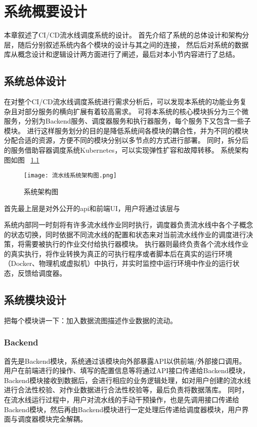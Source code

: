 
\chapter{系统概要设计}
本章叙述了CI/CD流水线调度系统的设计。
首先介绍了系统的总体设计和架构分层，随后分别叙述系统内各个模块的设计与其之间的连接，
然后后对系统的数据库从概念设计和逻辑设计两方面进行了阐述，最后对本小节内容进行了总结。

\section{系统总体设计}

在对整个CI/CD流水线调度系统进行需求分析后，可以发现本系统的功能业务复杂且对部分服务的横向扩展有着较高需求。
可将本系统的核心模块拆分为三个微服务，分别为Backend服务、调度器服务和执行器服务，每个服务下又包含一些子模块。
进行这样服务划分的目的是降低系统间各模块的耦合性，并为不同的模块分配合适的资源，方便不同的模块分别以多节点的方式进行部署。
同时，拆分后的服务借助容器调度系统Kubernetes，可以实现弹性扩容和故障转移。
系统架构图如图~ \ref{fig:系统架构图}

\begin{figure}[h]
  \centering
  \texttt{[image: 流水线系统架构图.png]}
  \caption{系统架构图}
  \label{fig:系统架构图}
\end{figure}

首先最上层是对外公开的api和前端UI，用户将通过该层与

系统内部同一时刻将有许多流水线作业同时执行，调度器负责流水线中各个子概念的状态切换，同时依据不同流水线的配置和状态来对当前流水线作业的调度进行决策，将需要被执行的作业交付给执行器模块。
执行器则最终负责各个流水线作业的真实执行，将作业转换为真正的可执行程序或者脚本后在真实的运行环境（Docker、物理机或虚拟机）中执行，并实时监控中运行环境中作业的运行状态，反馈给调度器。



\section{系统模块设计}
把每个模块讲一下：加入数据流图描述作业数据的流动。

\subsection{Backend}

首先是Backend模块，系统通过该模块向外部暴露API以供前端/外部接口调用。
用户在前端进行的操作、填写的配置信息等将通过API接口传递给Backend模块，Backend模块接收到数据后，会进行相应的业务逻辑处理，如对用户创建的流水线进行合法性校验、对作业数据进行合法性校验等，最后负责将数据落库。
同时，在流水线运行过程中，用户对流水线的手动干预操作，也是先调用接口传递给Backend模块，然后再由Backend模块进行一定处理后传递给调度器模块，用户界面与调度器模块完全解耦。


